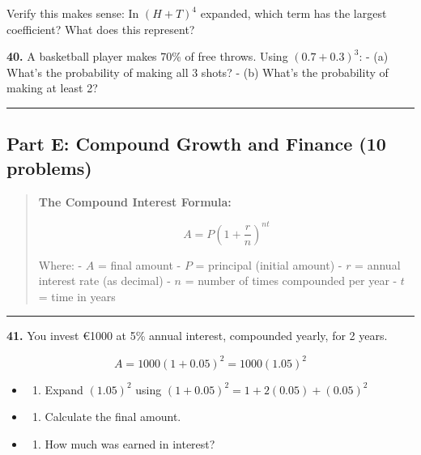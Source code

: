 \documentclass[
  11pt,
]{article}
\providecommand{\tightlist}{%
  \setlength{\itemsep}{0pt}\setlength{\parskip}{0pt}}
\begin{document}
Verify this makes sense: In \((H + T)^4\) expanded, which term has the
largest coefficient? What does this represent?

\textbf{40.} A basketball player makes 70\% of free throws. Using
\((0.7 + 0.3)^3\): - (a) What's the probability of making all 3 shots? -
(b) What's the probability of making at least 2?

\begin{center}\rule{0.5\linewidth}{0.5pt}\end{center}

\hypertarget{part-e-compound-growth-and-finance-10-problems}{%
\subsection{Part E: Compound Growth and Finance (10
problems)}\label{part-e-compound-growth-and-finance-10-problems}}

\begin{quote}
\textbf{The Compound Interest Formula:}

\[A = P\left(1 + \frac{r}{n}\right)^{nt}\]

Where: - \(A\) = final amount - \(P\) = principal (initial amount) -
\(r\) = annual interest rate (as decimal) - \(n\) = number of times
compounded per year - \(t\) = time in years
\end{quote}

\begin{center}\rule{0.5\linewidth}{0.5pt}\end{center}

\textbf{41.} You invest €1000 at 5\% annual interest, compounded yearly,
for 2 years.

\[A = 1000(1 + 0.05)^2 = 1000(1.05)^2\]

\begin{itemize}
\item
  \begin{enumerate}
  \def\labelenumi{(\alph{enumi})}
  \tightlist
  \item
    Expand \((1.05)^2\) using \((1 + 0.05)^2 = 1 + 2(0.05) + (0.05)^2\)
  \end{enumerate}
\item
  \begin{enumerate}
  \def\labelenumi{(\alph{enumi})}
  \setcounter{enumi}{1}
  \tightlist
  \item
    Calculate the final amount.
  \end{enumerate}
\item
  \begin{enumerate}
  \def\labelenumi{(\alph{enumi})}
  \setcounter{enumi}{2}
  \tightlist
  \item
    How much was earned in interest?
  \end{enumerate}
\end{itemize}
\end{document}
